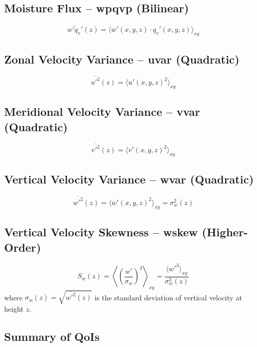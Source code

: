 \documentclass[11pt,a4paper]{article}
\begin{document}
\subsection{Moisture Flux -- wpqvp (Bilinear)}
\begin{equation}
    \overline{w'q_v'}(z) = \langle w'(x,y,z) \cdot q_v'(x,y,z) \rangle_{xy}
\end{equation}

\subsection{Zonal Velocity Variance -- uvar (Quadratic)}
\begin{equation}
    \overline{u'^2}(z) = \langle u'(x,y,z)^2 \rangle_{xy}
\end{equation}

\subsection{Meridional Velocity Variance -- vvar (Quadratic)}
\begin{equation}
    \overline{v'^2}(z) = \langle v'(x,y,z)^2 \rangle_{xy}
\end{equation}

\subsection{Vertical Velocity Variance -- wvar (Quadratic)}
\begin{equation}
    \overline{w'^2}(z) = \langle w'(x,y,z)^2 \rangle_{xy} = \sigma_w^2(z)
\end{equation}

\subsection{Vertical Velocity Skewness -- wskew (Higher-Order)}
\begin{equation}
    S_w(z) = \left\langle \left(\frac{w'}{\sigma_w}\right)^3 \right\rangle_{xy} = \frac{\langle w'^3 \rangle_{xy}}{\sigma_w^3(z)}
\end{equation}
where $\sigma_w(z) = \sqrt{\overline{w'^2}(z)}$ is the standard deviation of vertical velocity at height $z$.

\subsection{Summary of QoIs}
\end{document}
